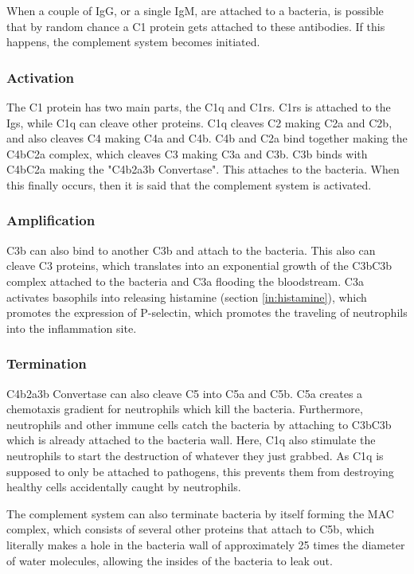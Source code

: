 When a couple of IgG, or a single IgM, are attached to a bacteria, is possible that by random chance a C1 protein gets attached to these antibodies. If this happens, the complement system becomes initiated.

\subsubsection{Activation}

The C1 protein has two main parts, the C1q and C1rs. C1rs is attached to the Igs, while C1q can cleave other proteins. C1q cleaves C2 making C2a and C2b, and also cleaves C4 making C4a and C4b. C4b and C2a bind together making the C4bC2a complex, which cleaves C3 making C3a and C3b. C3b binds with C4bC2a making the "C4b2a3b Convertase". This attaches to the bacteria. When this finally occurs, then it is said that the complement system is activated.

\subsubsection{Amplification}

C3b can also bind to another C3b and attach to the bacteria. This also can cleave C3 proteins, which translates into an exponential growth of the C3bC3b complex attached to the bacteria and C3a flooding the bloodstream. C3a activates basophils into releasing histamine (section \ref{in:histamine}), which promotes the expression of P-selectin, which promotes the traveling of neutrophils into the inflammation site.

\subsubsection{Termination}

C4b2a3b Convertase can also cleave C5 into C5a and C5b. C5a creates a chemotaxis gradient for neutrophils which kill the bacteria. Furthermore, neutrophils and other immune cells catch the bacteria by attaching to C3bC3b which is already attached to the bacteria wall. Here, C1q also stimulate the neutrophils to start the destruction of whatever they just grabbed. As C1q is supposed to only be attached to pathogens, this prevents them from destroying healthy cells accidentally caught by neutrophils.

The complement system can also terminate bacteria by itself forming the MAC complex, which consists of several other proteins that attach to C5b, which literally makes a hole in the bacteria wall of approximately 25 times the diameter of water molecules, allowing the insides of the bacteria to leak out.

